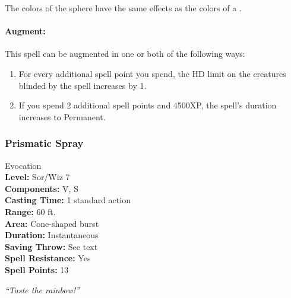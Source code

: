 The colors of the sphere have the same effects as the colors of a .

\paragraph{Augment:} This spell can be augmented in one or both of the following ways:
\begin{enumerate}
 \item For every additional spell point you spend, the HD limit on the creatures blinded by the spell increases by 1.
 \item If you spend 2 additional spell points and 4500XP, the spell's duration increases to Permanent.
\end{enumerate}
\subsubsection{Prismatic Spray}
\label{Spell:PrismaticSpray}
Evocation
\\ \textbf{Level:} Sor/Wiz 7
\\ \textbf{Components:} V, S
\\ \textbf{Casting Time:} 1 standard action
\\ \textbf{Range:} 60 ft.
\\ \textbf{Area:} Cone-shaped burst
\\ \textbf{Duration:} Instantaneous
\\ \textbf{Saving Throw:} See text
\\ \textbf{Spell Resistance:} Yes
\\ \textbf{Spell Points:} 13

\emph{``Taste the rainbow!''}

